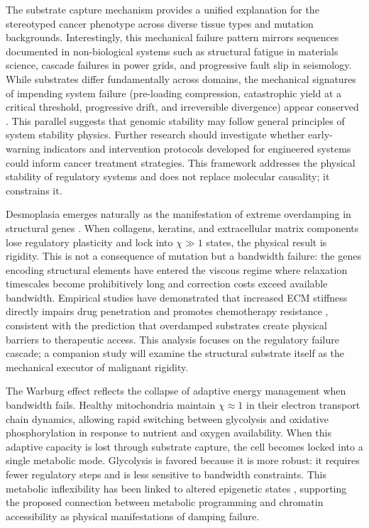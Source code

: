 \documentclass[11pt,letterpaper]{article}
\begin{document}
The substrate capture mechanism provides a unified explanation for the stereotyped cancer phenotype across diverse tissue types and mutation backgrounds. Interestingly, this mechanical failure pattern mirrors sequences documented in non-biological systems such as structural fatigue in materials science, cascade failures in power grids, and progressive fault slip in seismology. While substrates differ fundamentally across domains, the mechanical signatures of impending system failure (pre-loading compression, catastrophic yield at a critical threshold, progressive drift, and irreversible divergence) appear conserved \cite{Scheffer2009}. This parallel suggests that genomic stability may follow general principles of system stability physics. Further research should investigate whether early-warning indicators and intervention protocols developed for engineered systems could inform cancer treatment strategies. This framework addresses the physical stability of regulatory systems and does not replace molecular causality; it constrains it.

Desmoplasia emerges naturally as the manifestation of extreme overdamping in structural genes \cite{Dvorak1986}. When collagens, keratins, and extracellular matrix components lose regulatory plasticity and lock into $\chi \gg 1$ states, the physical result is rigidity. This is not a consequence of mutation but a bandwidth failure: the genes encoding structural elements have entered the viscous regime where relaxation timescales become prohibitively long and correction costs exceed available bandwidth. Empirical studies have demonstrated that increased ECM stiffness directly impairs drug penetration and promotes chemotherapy resistance \cite{Pickup2014}, consistent with the prediction that overdamped substrates create physical barriers to therapeutic access. This analysis focuses on the regulatory failure cascade; a companion study will examine the structural substrate itself as the mechanical executor of malignant rigidity.

The Warburg effect reflects the collapse of adaptive energy management when bandwidth fails. Healthy mitochondria maintain $\chi \approx 1$ in their electron transport chain dynamics, allowing rapid switching between glycolysis and oxidative phosphorylation in response to nutrient and oxygen availability. When this adaptive capacity is lost through substrate capture, the cell becomes locked into a single metabolic mode. Glycolysis is favored because it is more robust: it requires fewer regulatory steps and is less sensitive to bandwidth constraints. This metabolic inflexibility has been linked to altered epigenetic states \cite{Levine2010,Pavlova2016}, supporting the proposed connection between metabolic programming and chromatin accessibility as physical manifestations of damping failure.
\end{document}
